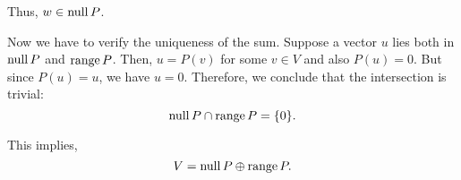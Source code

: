 \begin{xrcs}
\begin{xprf}
    Thus, $w \in \operatorname{null} P$.

    Now we have to verify the uniqueness of the sum. Suppose a vector $u$ lies both in $\operatorname{null} P$ and $\operatorname{range} P$. Then, $u = P(v)$ for some $v \in V$ and also $P(u) = 0$. But since $P(u) = u$, we have $u = 0$. Therefore, we conclude that the intersection is trivial:
    \begin{equation}
      \operatorname{null} P \cap \operatorname{range} P = \{ 0 \}.
    \end{equation}

    This implies,
    \begin{equation}
      V = \operatorname{null} P \oplus \operatorname{range} P.
    \end{equation}
  \end{xprf}

\end{xrcs}

